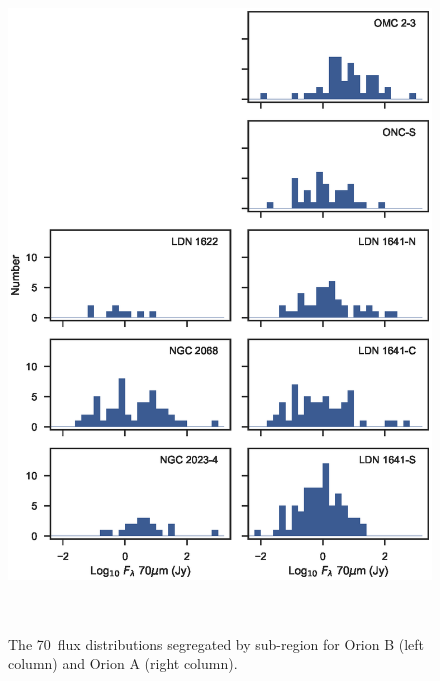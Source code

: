 \documentclass[manuscript]{aastex}
\begin{document}
\begin{figure}[ht]
\centering
\includegraphics[height=7in]{figures/LF70_byregion.eps}
\caption{The 70\micron\ flux distributions segregated by sub-region for Orion B (left column) and Orion A (right column).\label{fig:fd70regional}}
\end{figure}

\clearpage
\end{document}
